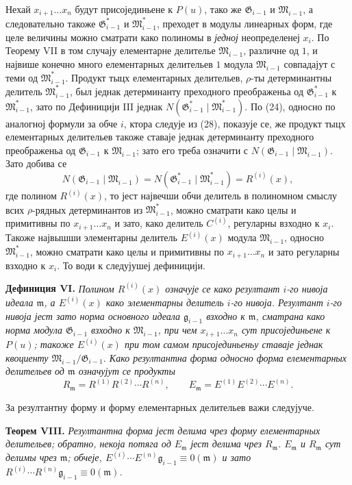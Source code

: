 \documentclass[11pt]{article}
\providecommand{\Gmod}{\mathfrak G}
\providecommand{\Mmod}{\mathfrak M}
\providecommand{\mideal}{\mathfrak m}
\providecommand{\gideal}{\mathfrak g}
\begin{document}
Нехай $x_{i+1}\ldots x_n$ будут присојединьене к $P(u)$, тако же $\Gmod_{i-1}$ и $\Mmod_{i-1}$, а следовательно такоже $\Gmod^*_{i-1}$ и $\Mmod^*_{i-1}$, преходет в модулы линеарных форм, где целе величины можно сматрати како полиномы в {\itshape једној} неопределенеј $x_i$. По Теорему VII в том случају елементарне делителье $\Mmod_{i-1}$, различне од $1$, и највише конечно много елементарных делительев $1$ модула $\Mmod_{i-1}$ совпадајут с теми од $\Mmod^*_{i-1}$. Продукт тыцх елементарных делительев, $\rho$-ты детерминантны делитель $\Mmod^*_{i-1}$, был једнак детерминанту преходного преображеньа од $\Gmod^*_{i-1}$ к $\Mmod^*_{i-1}$, зато по Дефиницији III једнак $N(\Gmod^*_{i-1}\mid\Mmod^*_{i-1})$. По (24), односно по аналогној формули за обче $i$, ктора следује из (28), показује се, же продукт тыцх елементарных делительев такоже ставаје једнак детерминанту преходного преображеньа од $\Gmod_{i-1}$ к $\Mmod_{i-1}$; зато его треба означити с $N(\Gmod_{i-1}\mid\Mmod_{i-1})$. Зато добива се
\[
 N(\Gmod_{i-1}\mid\Mmod_{i-1})=N(\Gmod^*_{i-1}\mid\Mmod^*_{i-1})=R^{(i)}(x),
\]
где полином $R^{(i)}(x)$, то јест највечши обчи делитель в полиномном смыслу всих $\rho$-рядных детерминантов из $\Mmod^*_{i-1}$, можно сматрати како целы и примитивны по $x_{i+1}\ldots x_n$ и зато, како делитель $C^{(i)}$, регуларны взходно к $x_i$. Такоже највышши элементарны делитель $E^{(i)}(x)$ модула $\Mmod_{i-1}$, односно $\Mmod^*_{i-1}$, можно сматрати како целы и примитивны по $x_{i+1}\ldots x_n$ и зато регуларны взходно к $x_i$. То води к следујушеј дефиницији.

\medskip
\noindent\textbf{Дефиниция VI.} {\itshape Полином $R^{(i)}(x)$ означује се како резултант $i$-го нивоја идеала $\mideal$, а $E^{(i)}(x)$ како элементарны делитель $i$-го нивоја. Резултант $i$-го нивоја јест зато норма основного идеала $\gideal_{i-1}$ взходно к $\mideal$, сматрана како норма модула $\Gmod_{i-1}$ взходно к $\Mmod_{i-1}$, при чем $x_{i+1}\ldots x_n$ сут присојединьене к $P(u)$; такоже $E^{(i)}(x)$ при том самом присојединьеньу ставаје једнак квоциенту $\Mmod_{i-1}/\Gmod_{i-1}$. Како резултантна форма односно форма елементарных делительев од $\mideal$ означујут се продукты}
\[
 R_\mideal=R^{(1)}R^{(2)}\cdots R^{(n)},\qquad
 E_\mideal=E^{(1)}E^{(2)}\cdots E^{(n)}.
\]

За резултантну форму и форму елементарных делительев важи следујуче.

\medskip
\noindent\textbf{Теорем VIII.} {\itshape Резултантна форма јест делима чрез форму елементарных делительев; обратно, некоја потяга од $E_\mideal$ јест делима чрез $R_\mideal$. $E_\mideal$ и $R_\mideal$ сут делимы чрез $\mideal$; обчеје, $E^{(i)}\cdots E^{(n)}\gideal_{i-1}\equiv0(\mideal)$ и зато $R^{(i)}\cdots R^{(n)}\gideal_{i-1}\equiv0(\mideal)$.}
\end{document}
